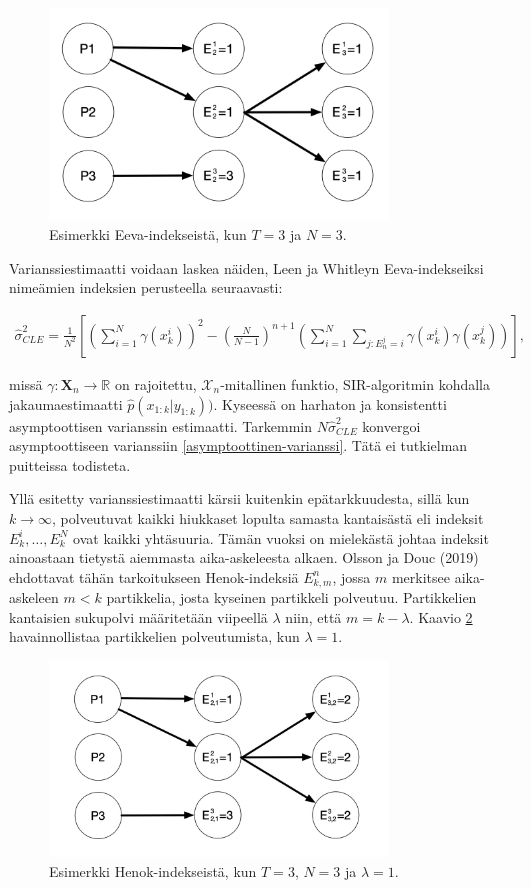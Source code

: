 \documentclass[
  12pt,
  a4paper, twoside]{book}
\begin{document}
\begin{figure}[H]
\centering
\includegraphics[width=9cm]{eevaindeksit}
\caption{Esimerkki Eeva-indekseistä, kun $T=3$ ja $N=3$.}
\label{fig:eeva-indeksit}
\end{figure}

Varianssiestimaatti voidaan laskea näiden, Leen ja Whitleyn Eeva-indekseiksi nimeämien indeksien perusteella seuraavasti:

\begin{align}\label{CLE-varianssi}
\hat{\sigma}^2_{CLE} = \frac{1}{N^2} \left[ (\sum_{i=1}^N \gamma(x_k^i))^2 - (\frac{N}{N-1})^{n+1} ( \sum_{i=1}^N \sum_{j:E_n^j=i} \gamma(x_k^i) \gamma(x_k^j)) \right]
,\end{align}

missä \(\gamma: \mathbf{X}_n \rightarrow \mathbb{R}\) on rajoitettu, \(\mathcal{X}_n\)-mitallinen funktio, SIR-algoritmin kohdalla jakaumaestimaatti \(\hat{p}(x_{1:k}|y_{1:k}))\). Kyseessä on harhaton ja konsistentti asymptoottisen varianssin estimaatti. Tarkemmin \(N\hat{\sigma}^2_{CLE}\) konvergoi asymptoottiseen varianssiin \ref{asymptoottinen-varianssi}. Tätä ei tutkielman puitteissa todisteta.

Yllä esitetty varianssiestimaatti kärsii kuitenkin epätarkkuudesta, sillä kun \(k \to \infty\), polveutuvat kaikki hiukkaset lopulta samasta kantaisästä eli indeksit \(E_k^i,\ldots,E_k^N\) ovat kaikki yhtäsuuria. Tämän vuoksi on mielekästä johtaa indeksit ainoastaan tietystä aiemmasta aika-askeleesta alkaen. Olsson ja Douc (2019) \citep{olsson-2019} ehdottavat tähän tarkoitukseen Henok-indeksiä \(E_{k,m}^n\), jossa \(m\) merkitsee aika-askeleen \(m<k\) partikkelia, josta kyseinen partikkeli polveutuu. Partikkelien kantaisien sukupolvi määritetään viipeellä \(\lambda\) niin, että \(m=k-\lambda\). Kaavio \ref{fig:henok-indeksit} havainnollistaa partikkelien polveutumista, kun \(\lambda=1\).

\begin{figure}[H]
\centering
\includegraphics[width=9cm]{henokindeksit}
\caption{Esimerkki Henok-indekseistä, kun $T=3$, $N=3$ ja $\lambda=1$.}
\label{fig:henok-indeksit}
\end{figure}
\end{document}
